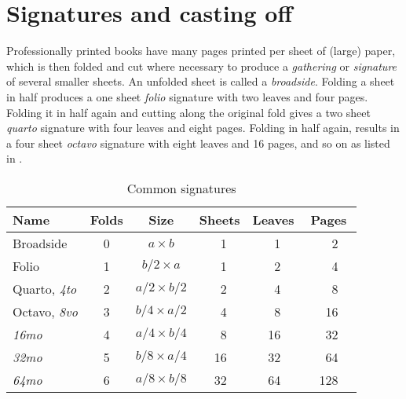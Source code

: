 \documentclass[10pt,a4paper,oneside,extrafontsizes]{memoir}%
\begin{document}
\section{Signatures and casting off}

\begin{paracol}{2}
\switchEng
    Professionally printed books have many pages printed per sheet of (large)
paper, which is then folded and cut where necessary to produce a 
\emph{gathering} or \emph{signature} of several smaller 
sheets. An 
unfolded sheet is called a \emph{broadside}. 
Folding a sheet in half produces a one sheet 
\emph{folio} signature with two leaves and four pages. 
Folding it in half again and cutting along the original fold gives a 
two sheet \emph{quarto} signature with four leaves
and eight pages. 
Folding in half again, 
results in a four sheet \emph{octavo} signature with eight
leaves and 16 pages, and so on as listed in .
\end{paracol}

\begin{table}
\centering
\caption{Common signatures} \label{tab:signatures}
\begin{tabular}{lcccrccrccrc} \toprule
Name      & Folds & Size             & \multicolumn{3}{c}{Sheets} & 
\multicolumn{3}{c}{Leaves} & \multicolumn{3}{c}{Pages} \\ \midrule
Broadside & 0     & $a \times b$     & &  1 & & &  1 & & &   2 & \\
Folio     & 1     & $b/2 \times a$   & &  1 & & &  2 & & &   4 & \\
Quarto, \emph{4to} & 2 & $a/2 \times b/2$ & & 2 & & & 4 & & & 8 & \\
Octavo, \emph{8vo} & 3 & $b/4 \times a/2$ & & 4 & & & 8 & & & 16 & \\
\emph{16mo} & 4   & $a/4 \times b/4$ & &  8 & & & 16 & & &  32 & \\
\emph{32mo} & 5   & $b/8 \times a/4$ & & 16 & & & 32 & & &  64 & \\
\emph{64mo} & 6   & $a/8 \times b/8$ & & 32 & & & 64 & & & 128 & \\ \bottomrule
\end{tabular}%
%
%
\end{table}
\end{document}
